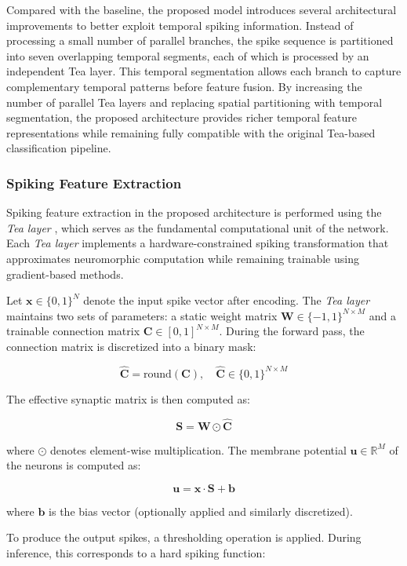 \documentclass[../main.tex]{subfiles}
\begin{document}
Compared with the baseline, the proposed model introduces several architectural improvements to better exploit temporal spiking information. Instead of processing a small number of parallel branches, the spike sequence is partitioned into seven overlapping temporal segments, each of which is processed by an independent Tea layer. This temporal segmentation allows each branch to capture complementary temporal patterns before feature fusion. By increasing the number of parallel Tea layers and replacing spatial partitioning with temporal segmentation, the proposed architecture provides richer temporal feature representations while remaining fully compatible with the original Tea-based classification pipeline.

\subsubsection{Spiking Feature Extraction}

Spiking feature extraction in the proposed architecture is performed using the \textit{Tea layer} \cite{RANC}, which serves as the fundamental computational unit of the network. Each \textit{Tea layer} \cite{RANC} implements a hardware-constrained spiking transformation that approximates neuromorphic computation while remaining trainable using gradient-based methods.

Let $\mathbf{x} \in \{0,1\}^N$ denote the input spike vector after encoding. The \textit{Tea layer} \cite{RANC} maintains two sets of parameters: a static weight matrix $\mathbf{W} \in \{-1,1\}^{N \times M}$ and a trainable connection matrix $\mathbf{C} \in [0,1]^{N \times M}$. During the forward pass, the connection matrix is discretized into a binary mask:

\[
\hat{\mathbf{C}} = \text{round}(\mathbf{C}), \quad \hat{\mathbf{C}} \in \{0,1\}^{N \times M}
\]

The effective synaptic matrix is then computed as:

\[
\mathbf{S} = \mathbf{W} \odot \hat{\mathbf{C}}
\]

where $\odot$ denotes element-wise multiplication. The membrane potential $\mathbf{u} \in \mathbb{R}^M$ of the neurons is computed as:

\[
\mathbf{u} = \mathbf{x} \cdot \mathbf{S} + \mathbf{b}
\]

where $\mathbf{b}$ is the bias vector (optionally applied and similarly discretized).

To produce the output spikes, a thresholding operation is applied. During inference, this corresponds to a hard spiking function:
\end{document}
